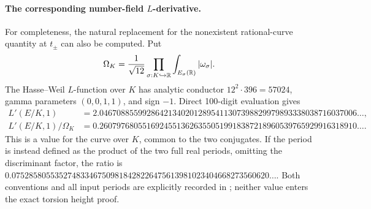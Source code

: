 \paragraph{The corresponding number-field $L$-derivative.}
For completeness, the natural replacement for the nonexistent
rational-curve quantity at $t_\pm$ can also be computed. Put
\[
 \Omega_K=\frac1{\sqrt{12}}
  \prod_{\sigma:K\hookrightarrow\mathbb R}
       \int_{E_\sigma(\mathbb R)}|\omega_\sigma|.
\]
The Hasse--Weil $L$-function over $K$ has analytic conductor
$12^2\cdot396=57024$, gamma parameters $(0,0,1,1)$, and sign
$-1$. Direct 100-digit evaluation gives
\begin{align*}
 L'(E/K,1)&=2.046708855992864213402012895411307398829979893338038716037006\ldots,\\
 L'(E/K,1)/\Omega_K
 &=0.260797680551692455136263550519918387218960539765929916318910\ldots.
\end{align*}
This is a value for the curve over $K$, common to the two
conjugates. If the period is instead defined as the product of
the two full real periods, omitting the discriminant factor,
the ratio is
$0.075285805535274833467509818428226475613981023404668273560620\ldots$.
Both conventions and all input periods are explicitly recorded
in ; neither value enters
the exact torsion height proof.
